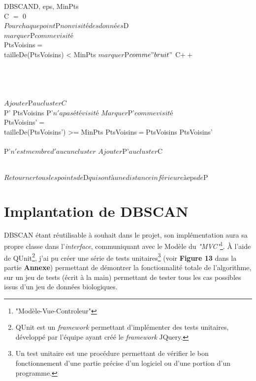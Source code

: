 \documentclass[pdftex,12pt,a4paper]{report}
\begin{document}
\begin{spacing}{1.2}
\begin{pseudocode}{DBSCAN}{D, eps, MinPts}
\\
C $=$ 0\\
$Pour chaque point $P$ non visité des données $D\\
$marquer $P$ comme visité$\\
PtsVoisins$ = $\\
\IF tailleDe(PtsVoisins) < MinPts
\THEN $marquer $P$ comme "bruit"$
\ELSE 
	\BEGIN
		C$++$\\
		\\
	\END\\
\\

\\
	$Ajouter $P$ au cluster C$\\
	\FOREACH P' \in PtsVoisins \DO
			\IF P'$ n'a pas été visité$
			\THEN 
				\BEGIN
					$Marquer $P'$ comme visité$\\
					PtsVoisins'$ = $ \\
					\IF tailleDe(PtsVoisins') >= MinPts
					\THEN PtsVoisins$ = $PtsVoisins \cup PtsVoisins'\\
				\END\\
			\IF P'$ n'est membre d'aucun cluster$
			\THEN $Ajouter $P'$ au cluster $C
\ENDPROCEDURE

\\
	$Retourner tous les points de $D$ qui sont à une distance inférieure à $eps$ de $P
\ENDPROCEDURE
\end{pseudocode}

\section{Implantation de DBSCAN}

DBSCAN étant réutilisable à souhait dans le projet, son implémentation aura sa propre classe dans l'\textit{interface}, communiquant avec le Modèle du \textit{"MVC"}\footnote{"Modèle-Vue-Controleur"}.
À l'aide de QUnit\footnote{QUnit est un \textit{framework} permettant d'implémenter des tests unitaires, développé par l'équipe ayant créé le \textit{framework} JQuery.}, j'ai pu créer une série de tests unitaires\footnote{Un test unitaire est une procédure permettant de vérifier le bon fonctionnement d'une partie précise d'un logiciel ou d'une portion d'un programme.} (voir \textbf{Figure 13} dans la partie \textbf{Annexe}) permettant de démontrer la fonctionnalité totale de l'algorithme, sur un jeu de tests (écrit à la main) permettant de tester tous les cas possibles issus d'un jeu de données biologiques.


\end{spacing}
\end{document}
